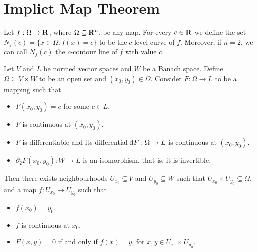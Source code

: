 \section{Implict Map Theorem}

\begin{definition}
\label{def:level-curve}
Let \(f: \Omega \to \mathbf{R}\), where \(\Omega \subseteq \mathbf{R}^n\), be any map. For every \(c \in \mathbf{R}\) we
define the set \(N_f(c) = \{x \in \Omega \colon f(x) = c\}\) to be the \(c\)-level
curve of \(f\). Moreover, if \(n = 2\), we can call \(N_f(c)\) the \(c\)-contour
line of \(f\) with value \(c\).
\end{definition}

\begin{theorem}
\label{thm:implicit-map}
Let \(V\) and \(L\) be normed vector spaces and \(W\) be a Banach
space. Define \(\Omega \subseteq V \times W\) to be an open set and \((x_0, y_0) \in \Omega\). Consider
\(F: \Omega \to L\) to be a mapping such that
\begin{itemize}\setlength\itemsep{0em}
  \item \(F(x_0, y_0) = c\) for some \(c \in L\).
  \item \(F\) is continuous at \((x_0, y_0)\).
  \item \(F\) is differentiable and its differential \(\mathrm{d} F: \Omega \to L\)
    is continuous at \((x_0, y_0)\).
  \item \(\partial_2F(x_0, y_0): W \to L\) is an isomorphism, that is, it is invertible.
\end{itemize}
Then there exists neighbourhoods \(U_{x_0} \subseteq V\) and \(U_{y_0} \subseteq W\) such that
\(U_{x_0} \times U_{y_0} \subseteq \Omega\), and a map \(f: U_{x_0} \to U_{y_0}\) such that
\begin{itemize}\setlength\itemsep{0em}
  \item \(f(x_0) = y_0\).
  \item \(f\) is continuous at \(x_0\).
  \item \(F(x, y) = 0\) if and only if \(f(x) = y\), for \(x, y \in U_{x_0} \times
  U_{y_0}\).
\end{itemize}
\end{theorem}

